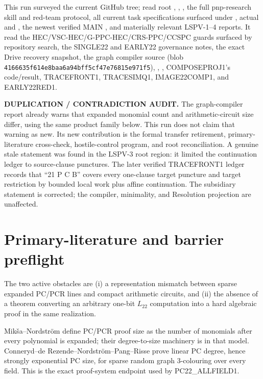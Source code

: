 \documentclass[11pt]{article}
\begin{document}
This run surveyed the current GitHub tree; read root ,
, , the full pnp-research skill and red-team
protocol, all current task specifications surfaced under ,
actual  and , the newest verified MAIN
, and materially
relevant LSPV-1--4 reports.  It read the HEC/VSC-HEC/G-PPC-HEC/CRS-PPC/CCSPC
guards surfaced by repository search, the SINGLE22 and EARLY22 governance
notes, the exact Drive recovery snapshot, the graph compiler source
(blob \texttt{4166635f614e8baa6a94bff5cf47e76815e971f5}),
,
, COMPOSEPROJ1's code/result,
TRACEFRONT1, TRACESIMQ1, IMAGE22COMP1, and EARLY22RED1.

\textbf{DUPLICATION / CONTRADICTION AUDIT.}
The graph-compiler report already warns that expanded monomial count and
arithmetic-circuit size differ, using the same product family below.  This
run does not claim that warning as new.  Its new contribution is the formal
transfer retirement, primary-literature cross-check, hostile-control program,
and root reconciliation.  A genuine stale statement was found in the LSPV-3
root region: it limited the continuation ledger to source-clause punctures.
The later verified TRACEFRONT1 ledger records that ``21 P C B'' covers every
one-clause target puncture and target restriction by bounded local work plus
affine continuation.  The subsidiary statement is corrected; the compiler,
minimality, and Resolution projection are unaffected.

\section{Primary-literature and barrier preflight}
The two active obstacles are (i) a representation mismatch between sparse
expanded PC/PCR lines and compact arithmetic circuits, and (ii) the absence
of a theorem converting an arbitrary one-bit $L_{22}$ computation into a
hard algebraic proof in the same realization.

Mik\v{s}a--Nordstr\"om define PC/PCR proof size as the number of monomials
after every polynomial is expanded; their degree-to-size machinery is in that
model.  Conneryd--de Rezende--Nordstr\"om--Pang--Risse prove linear PC degree,
hence strongly exponential PC size, for sparse random graph 3-colouring over
every field.  This is the exact proof-system endpoint used by PC22\_ALLFIELD1.
\end{document}
